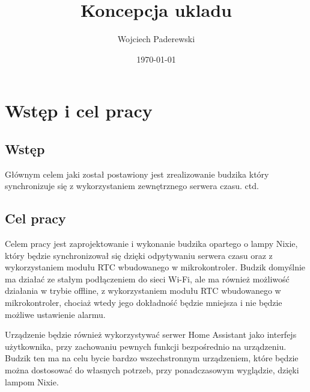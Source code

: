 \documentclass[../main.tex]{subfiles}
\author{Wojciech Paderewski}
\date{\today}
\title{Koncepcja ukladu}
\begin{document}
\section{Wstęp i cel pracy}
\subsection{Wstęp}
Głównym celem jaki został postawiony jest zrealizowanie budzika który synchronizuje się z wykorzystaniem zewnętrznego serwera czasu. ctd.
\subsection{Cel pracy}
Celem pracy jest zaprojektowanie i wykonanie budzika opartego o lampy Nixie, który będzie synchronizował się dzięki odpytywaniu serwera czasu oraz
z wykorzystaniem modułu RTC wbudowanego w mikrokontroler. Budzik domyślnie ma działać ze stałym podłączeniem do sieci Wi-Fi, ale ma również możliwość
działania w trybie offline, z wykorzystaniem modułu RTC wbudowanego w mikrokontroler, chociaż wtedy jego dokładność będzie mniejsza i nie będzie możliwe
ustawienie alarmu. 

Urządzenie będzie również wykorzystywać serwer Home Assistant jako interfejs użytkownika, przy zachowaniu pewnych funkcji bezpośrednio
na urządzeniu. Budzik ten ma na celu bycie bardzo wszechstronnym urządzeniem, które będzie można dostosować do własnych potrzeb, przy ponadczasowym wyglądzie, 
dzięki lampom Nixie.
\end{document}
